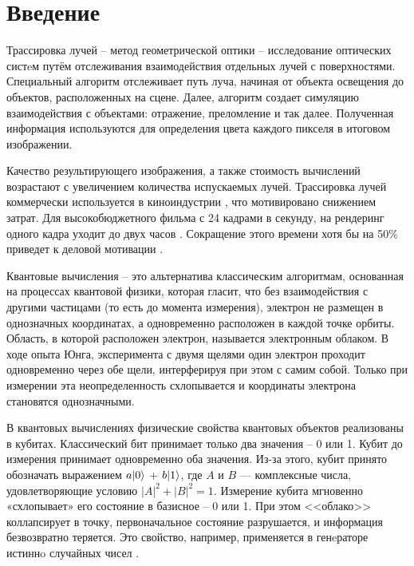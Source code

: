 \chapter*{Введение}

Трассировка лучей -- метод геометрической оптики -- исследование оптических систeм путём отслеживания взаимодействия отдельных лучей с поверхностями. Специальный алгоритм отслеживает путь луча, начиная от объекта освещения до объектов, расположенных на сцене. Далее, алгоритм создает симуляцию взаимодействия с объектами: отражение, преломление и так далее. Полученная информация используются для определения цвета каждого пикселя в итоговом изображении. 

Качество результирующего изображения, а также стоимость вычислений возрастают с увеличением количества испускаемых лучей. Трассировка лучей коммерчески используется в киноиндустрии \cite{path-traced-movies}, что мотивировано снижением затрат. Для высокобюджетного фильма с 24 кадрами в секунду, на рендеринг одного кадра уходит до двух часов \cite{path-traced-movies}. Сокращение этого времени хотя бы на 50\% приведет к деловой мотивации \cite{path-traced-movies}. 

Квантовые вычисления -- это альтернатива классическим алгоритмам, основанная на процессах квантовой физики, которая гласит, что без взаимодействия с другими частицами (то есть до момента измерения), электрон не
размещен в однозначных координатах, а одновременно расположен
в каждой точке орбиты. Область, в которой расположен электрон, называется электронным облаком. В ходе опыта Юнга, эксперимента с двумя щелями один электрон проходит одновременно через обе щели, интерферируя при этом с самим собой. Только при измерении эта неопределенность схлопывается и координаты электрона становятся однозначными.

В квантовых вычислениях физические свойства квантовых объектов реализованы в кубитах. Классический бит принимает только два значения – 0 или 1. Кубит до измерения принимает
одновременно оба значения. Из-за этого, кубит принято обозначать выражением $a\lvert0\rangle$ + $b\lvert1\rangle$, где $A$ и $B$ — комплексные числа, удовлетворяющие условию $|A|^2 + |B|^2 = 1$. Измерение кубита мгновенно «схлопывает»  его состояние в базисное – 0 или 1. При этом <<облако>> коллапсирует
в точку, первоначальное состояние разрушается, и информация безвозвратно теряется. Это свойство, например, применяется в генeраторе истиннo случайных чисел \cite{generator}. %

